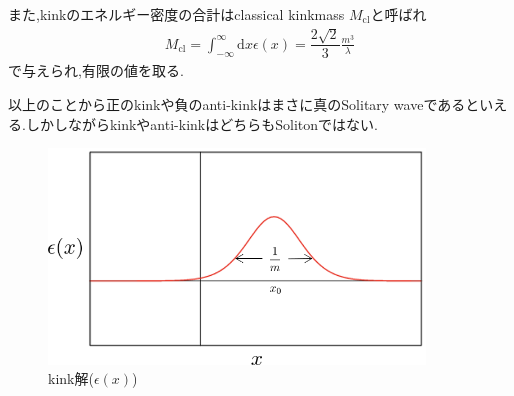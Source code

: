 \documentclass[dvipdfmx,11pt,a4paper]{jsbook}
\begin{document}
また,kinkのエネルギー密度の合計はclassical kinkmass $M_{\mathrm{cl}}$と呼ばれ
\begin{align}
    M_{\mathrm{cl}}=\int_{-\infty}^{\infty} \mathrm{d}x \epsilon(x)=\dfrac{2\sqrt{2}}{3}\frac{m^3}{\lambda}
\end{align}
で与えられ,有限の値を取る.

以上のことから正のkinkや負のanti-kinkはまさに真のSolitary waveであるといえる.しかしながらkinkやanti-kinkはどちらもSolitonではない.
\begin{figure}[H]
    \centering
    \includegraphics[width=10cm]{figure/kink_energy.png}
    \caption{kink解($\epsilon(x)$)}
    \label{kink_energy}
\end{figure}
\end{document}
